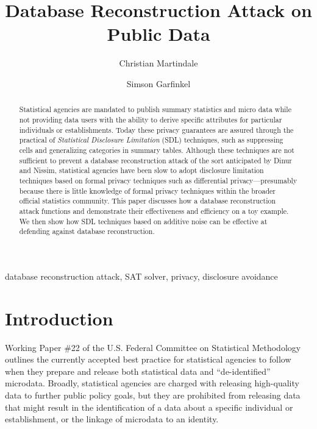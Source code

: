 \documentclass[runningheads]{llncs}
\newif\ifanonymized
\begin{document}
\title{Database Reconstruction Attack on Public Data}
\ifanonymized
\author{Anonymized Author(s)}
\institute{Institute for Anonymous Papers}
\else
\author{Christian Martindale \and Simson Garfinkel}
\fi

\maketitle
\begin{abstract}
Statistical agencies are mandated to publish summary statistics and
micro data while not providing data users with the ability to derive
specific attributes for particular individuals or
establishments. Today these privacy guarantees are assured through the
practical of \emph{Statistical Disclosure Limitation} (SDL)
techniques, such as suppressing cells and generalizing categories in
summary tables. Although these techniques are not sufficient to
prevent a database reconstruction attack of the sort anticipated by
Dinur and Nissim\cite{noise}, statistical agencies have been slow to
adopt disclosure limitation techniques based on formal privacy
techniques such as differential privacy---presumably because there is
little knowledge of formal privacy techniques within the broader
official statistics community.  This paper discusses how a database
reconstruction attack functions and demonstrate their effectiveness
and efficiency on a toy example. We then show how SDL techniques based
on additive noise can be effective at defending against database
reconstruction.
\end{abstract}

\begin{keywords}
database reconstruction attack, SAT solver, privacy, disclosure avoidance
\end{keywords}


\section{Introduction}
Working Paper \#22 of the U.S. Federal Committee on Statistical
Methodology\cite{workingpaper22} outlines the currently accepted best
practice for statistical agencies to follow when they prepare and
release both statistical data and ``de-identified''
microdata. Broadly, statistical agencies are charged with releasing
high-quality data to further public policy goals, but they are
prohibited from releasing data that might result in the identification
of a data about a specific individual or establishment, or the linkage
of microdata to an identity.
\end{document}
